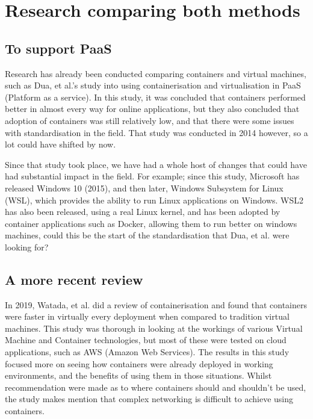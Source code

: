 \section{Research comparing both methods}
\label{ComparisonStudies}
\subsection{To support PaaS}
Research has already been conducted comparing containers and virtual machines, such as Dua, et al.'s study into using containerisation and virtualisation in PaaS (Platform as a service)\citep{dua14}. In this study, it was concluded that containers performed better in almost every way for online applications, but they also concluded that adoption of containers was still relatively low, and that there were some issues with standardisation in the field\citep{dua14}. That study was conducted in 2014 however, so a lot could have shifted by now. 

Since that study took place, we have had a whole host of changes that could have had substantial impact in the field. For example; since this study, Microsoft has released Windows 10 (2015)\citep{WindowsIntro}, and then later, Windows Subsystem for Linux (WSL), which provides the ability to run Linux applications on Windows\citep{wslrelease}. WSL2 has also been released, using a real Linux kernel\citep{wslkernel}, and has been adopted by container applications such as Docker\citep{Dockerwsl}, allowing them to run better on windows machines, could this be the start of the standardisation that Dua, et al. were looking for?

\subsection{A more recent review}
In 2019, Watada, et al. did a review of containerisation and found that containers were faster in virtually every deployment when compared to tradition virtual machines\citep{watanda19}. This study was thorough in looking at the workings of various Virtual Machine and Container technologies, but most of these were tested on cloud applications, such as AWS (Amazon Web Services). The results in this study focused more on seeing how containers were already deployed in working environments\citep[VII.]{watanda19}, and the benefits of using them in those situations. Whilst recommendation were made as to where containers should and shouldn't be used, the study makes mention that complex networking is difficult to achieve using containers\citep[VIII. A.]{watanda19}.

